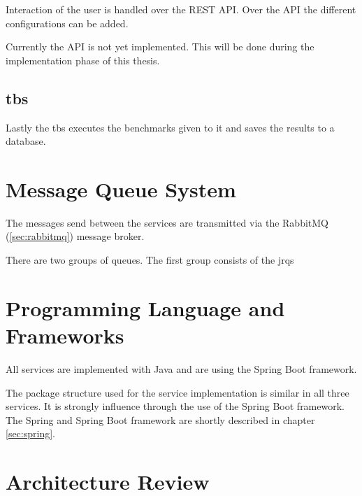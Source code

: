 Interaction of the user is handled over the REST API.
Over the API the different configurations can be added.

Currently the API is not yet implemented.
This will be done during the implementation phase of this thesis.


\subsection{\acl{tbs}}
\label{sec:ts_benchmarking_service}
Lastly the \ac{tbs} executes the benchmarks given to it and saves the results to a database.



\section{Message Queue System}
\label{sec:message_queue}
The messages send between the services are transmitted via the RabbitMQ (\ref{sec:rabbitmq}) message broker.

There are two groups of queues.
The first group consists of the \aclp{jrq}




\section{Programming Language and Frameworks}
\label{sec:prog_lang_and_framework}
All services are implemented with Java and are using the Spring Boot framework.

The package structure used for the service implementation is similar in all three services.
It is strongly influence through the use of the Spring Boot framework.
The Spring and Spring Boot framework are shortly described in chapter \ref{sec:spring}.

\section{Architecture Review}
\label{sec:architecture_review}


